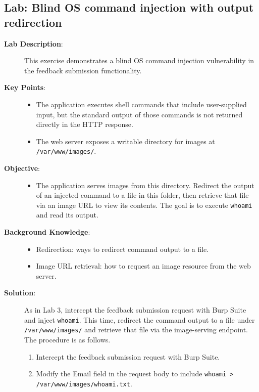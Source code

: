 \documentclass{article}
\begin{document}
\subsection*{Lab: Blind OS command injection with output redirection}
\begin{description}
  \item[\textbf{Lab Description}:] This exercise demonstrates a blind OS command injection vulnerability in the feedback submission functionality.
  \item[\textbf{Key Points}:]\leavevmode\par
    \begin{itemize}
      \item The application executes shell commands that include user-supplied input, but the standard output of those commands is not returned directly in the HTTP response.
      \item The web server exposes a writable directory for images at \texttt{/var/www/images/}.
    \end{itemize}

  \item[\textbf{Objective}:] \leavevmode\par
    \begin{itemize}
      \item The application serves images from this directory. Redirect the output of an injected command to a file in this folder, then retrieve that file via an image URL to view its contents. The goal is to execute \texttt{whoami} and read its output.
    \end{itemize}

  \item[\textbf{Background Knowledge}:]\leavevmode\par
    \begin{itemize}
      \item Redirection: ways to redirect command output to a file.
      \item Image URL retrieval: how to request an image resource from the web server.
    \end{itemize}

  \item[\textbf{Solution}:] \leavevmode\par
    As in Lab 3, intercept the feedback submission request with Burp Suite and inject \texttt{whoami}. This time, redirect the command output to a file under \texttt{/var/www/images/} and retrieve that file via the image-serving endpoint. The procedure is as follows.
  \begin{enumerate}
    \item Intercept the feedback submission request with Burp Suite.
    \item Modify the Email field in the request body to include \texttt{whoami > /var/www/images/whoami.txt}.
    

\end{enumerate}
\end{description}
\end{document}
